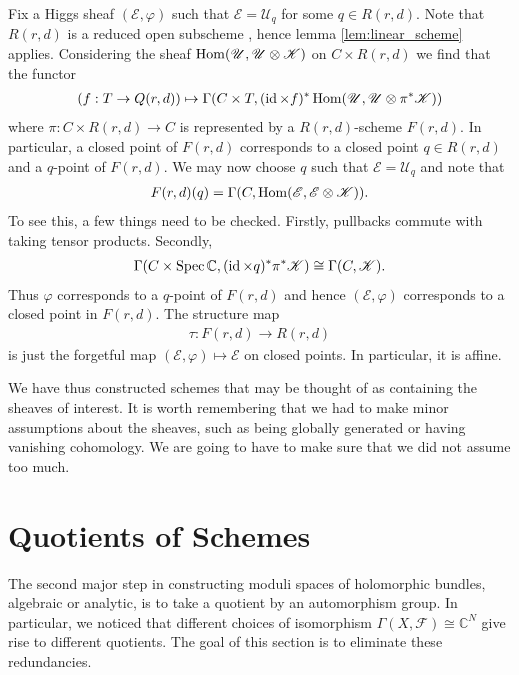 \documentclass[12pt]{ociamthesis}  %
\begin{document}
\begin{example}\label{ex:quot_scheme_of_higgs}
  Fix a Higgs sheaf $(\mathscr E,\varphi)$ such that
  $\mathscr E = \mathscr U_q$ for some $q\in R(r,d)$.
  Note that $R(r,d)$ is a reduced open subscheme
  \cite[281]{nitsure1991}, hence lemma
  \ref{lem:linear_scheme} applies.
  Considering the sheaf $\operatorname{Hom}(\mathscr U,\mathscr U\otimes\mathscr K)$ on
  $C\times R(r,d)$ we find that the functor
  \begin{align*}
    (f:T\to Q(r,d))
    \mapsto
    \Gamma(C\times T,(\operatorname{id}\times f)^*\operatorname{Hom}(\mathscr U,\mathscr U\otimes\pi^*\mathscr K))
  \end{align*}
  where $\pi : C\times R(r,d)\to C$ is represented by a
  $R(r,d)$-scheme $F(r,d)$.
  In particular, a closed point of $F(r,d)$ corresponds to a
  closed point $q\in R(r,d)$ and a $q$-point of $F(r,d)$.
  We may now choose $q$ such that $\mathscr E = \mathscr U_q$ and note
  that
  \begin{align*}
    F(r,d)(q) = \Gamma(C,\operatorname{Hom}(\mathscr E,\mathscr E\otimes\mathscr K)).
  \end{align*}
  To see this, a few things need to be checked. Firstly, pullbacks
  commute with taking tensor products. Secondly,
  \begin{align*}
    \Gamma(C\times\operatorname{Spec}\mathbb C,(\operatorname{id}\times q)^*\pi^*\mathscr K)
    \cong \Gamma(C,\mathscr K).
  \end{align*}
  Thus $\varphi$ corresponds to a $q$-point of $F(r,d)$
  and hence $(\mathscr E,\varphi)$ corresponds to a closed point in
  $F(r,d)$. The structure map
  \begin{align*}
    \tau : F(r,d) \longrightarrow R(r,d)
  \end{align*}
  is just the forgetful map $(\mathscr E,\varphi) \mapsto \mathscr E$
  on closed points. In particular, it is affine.
\end{example}

We have thus constructed schemes that may be thought of as containing
the sheaves of interest. It is worth remembering that we had to make
minor assumptions about the sheaves, such as being globally generated
or having vanishing cohomology. We are going to have to make sure that
we did not assume too much.

\section{Quotients of Schemes}

The second major step in constructing moduli spaces of holomorphic
bundles, algebraic or analytic, is to take a quotient by an automorphism
group. In particular, we noticed that different choices of isomorphism
$\Gamma(X,\mathscr F)\cong\mathbb{C}^N$ give rise to different quotients.
The goal of this section is to eliminate these redundancies.
\end{document}
